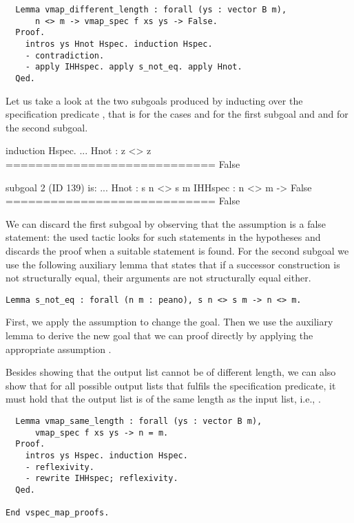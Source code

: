 \begin{verbatim}
  Lemma vmap_different_length : forall (ys : vector B m),
      n <> m -> vmap_spec f xs ys -> False.
  Proof.
    intros ys Hnot Hspec. induction Hspec.
    - contradiction.
    - apply IHHspec. apply s_not_eq. apply Hnot.
  Qed.
\end{verbatim}

Let us take a look at the two subgoals produced by inducting over the specification predicate , that is for the cases  and   for the first subgoal and  and  for the second subgoal.

\begin{cproof}{induction Hspec.}
  ...
  Hnot : z <> z
  ============================
  False

subgoal 2 (ID 139) is:
  ...
  Hnot : s n <> s m
  IHHspec : n <> m -> False
  ============================
  False
\end{cproof}

We can discard the first subgoal by observing that the assumption  is a false statement: the used tactic  looks for such statements in the hypotheses and discards the proof when a suitable statement is found.
For the second subgoal we use the following auxiliary lemma that states that if a successor construction is not structurally equal, their arguments are not structurally equal either.

\begin{verbatim}
Lemma s_not_eq : forall (n m : peano), s n <> s m -> n <> m.
\end{verbatim}

First, we apply the assumption  to change the goal.
Then we use the auxiliary lemma to derive the new goal  that we can proof directly by applying the appropriate assumption
.

Besides showing that the output list cannot be of different length, we can also show that for all possible output lists  that fulfils the specification predicate, it must hold that the output list is of the same length as the input list, i.e., .

\begin{verbatim}
  Lemma vmap_same_length : forall (ys : vector B m),
      vmap_spec f xs ys -> n = m.
  Proof.
    intros ys Hspec. induction Hspec.
    - reflexivity.
    - rewrite IHHspec; reflexivity.
  Qed.

End vspec_map_proofs.
\end{verbatim}

